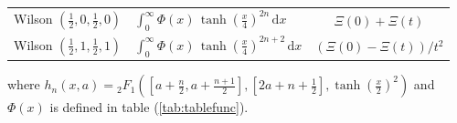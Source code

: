 \documentclass[a4paper,11pt,twoside]{amsart}
\newcommand{\defeq}{=}
\newcommand{\defeq}{\stackrel{\scriptscriptstyle \textnormal{def}}{=}}
\begin{document}
{\begin{minipage}{\textwidth}
\begin{table}[H]
\begin{center}
\begin{tabular}{l|l|c|}
      Wilson $\left(\frac12,0,\frac12,0\right)$ & $\displaystyle \int_{0}^\infty \Phi(x)\,\tanh\left(\frac{x}{4}\right)^{2n}\, \mathrm{d}x $  &$\Xi(0) + \Xi(t)$ \\    
      Wilson $\left(\frac12,1,\frac12,1\right)$ & $\displaystyle \int_{0}^\infty \Phi(x)\,\tanh\left(\frac{x}{4}\right)^{2n+2}\, \mathrm{d}x $  &$\left(\Xi(0)-\Xi(t)\right)/t^2 $ \\          
    \end{tabular}
  \end{center}
\end{table}

where $\displaystyle h_n(x,a) \defeq {}_2F_1\left(\left[a+\frac{n}{2}, a+\frac{n+1}{2}\right],\left[2a+n+\frac12\right],\tanh\left(\frac{x}{2}\right)^2\right)$ and $\Phi(x)$ is defined in table (\ref{tab:tablefunc}).
\end{minipage}}
\end{document}
